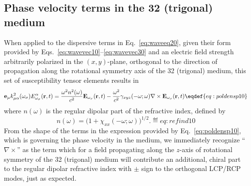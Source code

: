 \subsection{Phase velocity terms in the 32 (trigonal) medium}
When applied to the dispersive terms in Eq.~\eqref{eq:waveeq20}, given their
form provided by Eqs.~\eqref{eq:wavevec10}--\eqref{eq:wavevec30} and an
electric field strength arbitrarily polarized in the $(x,y)$-plane, orthogonal
to the direction of propagation along the rotational symmetry axis of the 32
(trigonal) medium, this set of susceptibility tensor elements results in
$$
  {\bf e}_{\mu}k^2_{\mu\alpha}(\omega_{\sigma})E^{\alpha}_{\omega_{\sigma}}({\bf r},t)
    ={{\omega^2 n^2(\omega)}\over{c^2}}{\bf E}_{\omega_{\sigma}}({\bf r},t)
       -{{\omega^2}\over{c^2}}\gamma_{xyz}(-\omega;\omega)
          \nabla\times{\bf E}_{\omega_{\sigma}}({\bf r},t)
  \eqdef{eq:poldensp10}
$$
where $n(\omega)$ is the regular dipolar part of the refractive index, defined
by
$$
  n(\omega)=\big(1+\chi_{xx}(-\omega;\omega)\big)^{1/2}.
  \eqdef{eq:refind10}
$$
From the shape of the terms in the expression provided by
Eq.~\eqref{eq:poldensp10}, which is governing the phase
velocity in the medium, we immediately recognize ``$\nabla\times$'' as the
term which for a field propagating along the $z$-axis of rotational symmetry
of the 32 (trigonal) medium will contribute an additional, chiral part to the
regular dipolar refractive index with $\pm$ sign to the orthogonal LCP/RCP
modes, just as expected.


